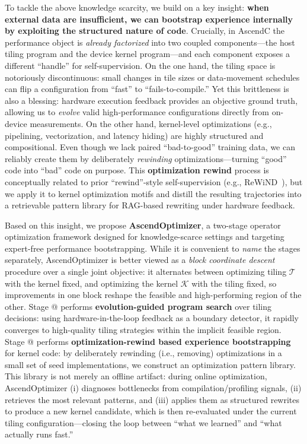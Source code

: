 \documentclass{article}
\makeatletter
\theoremstyle{plain}
\theoremstyle{definition}
\theoremstyle{remark}
\newcommand{\Rmnum}[1]{\expandafter\@slowromancap\romannumeral #1@}
\makeatother
\begin{document}
To tackle the above knowledge scarcity, we build on a key insight: \textbf{when external data are insufficient, we can bootstrap experience internally by exploiting the structured nature of code}. Crucially, in AscendC the performance object is \emph{already factorized} into two coupled components---the host tiling program and the device kernel program---and each component exposes a different ``handle'' for self-supervision.
On the one hand, the tiling space is notoriously discontinuous: small changes in tile sizes or data-movement schedules can flip a configuration from ``fast'' to ``fails-to-compile.'' Yet this brittleness is also a blessing: hardware execution feedback provides an objective ground truth, allowing us to \emph{evolve} valid high-performance configurations directly from on-device measurements.
On the other hand, kernel-level optimizations (e.g., pipelining, vectorization, and latency hiding) are highly structured and compositional. Even though we lack paired ``bad-to-good'' training data, we can reliably create them by deliberately \emph{rewinding} optimizations---turning ``good'' code into ``bad'' code on purpose. This \textbf{optimization rewind} process is conceptually related to prior ``rewind''-style self-supervision (e.g., ReWiND~\cite{zhang2025rewind}), but we apply it to kernel optimization motifs and distill the resulting trajectories into a retrievable pattern library for RAG-based rewriting under hardware feedback.

Based on this insight, we propose \textbf{AscendOptimizer}, a two-stage operator optimization framework designed for knowledge-scarce settings and targeting expert-free performance bootstrapping. While it is convenient to \emph{name} the stages separately, AscendOptimizer is better viewed as a \emph{block coordinate descent} procedure over a single joint objective: it alternates between optimizing tiling $\mathcal{T}$ with the kernel fixed, and optimizing the kernel $\mathcal{K}$ with the tiling fixed, so improvements in one block reshape the feasible and high-performing region of the other.
Stage \Rmnum{1} performs \textbf{evolution-guided program search} over tiling decisions: using hardware-in-the-loop feedback as a boundary detector, it rapidly converges to high-quality tiling strategies within the implicit feasible region.
Stage \Rmnum{2} performs \textbf{optimization-rewind based experience bootstrapping} for kernel code: by deliberately rewinding (i.e., removing) optimizations in a small set of seed implementations, we construct an optimization pattern library. This library is not merely an offline artifact: during online optimization, AscendOptimizer (i) diagnoses bottlenecks from compilation/profiling signals, (ii) retrieves the most relevant patterns, and (iii) applies them as structured rewrites to produce a new kernel candidate, which is then re-evaluated under the current tiling configuration---closing the loop between ``what we learned'' and ``what actually runs fast.''
\end{document}
